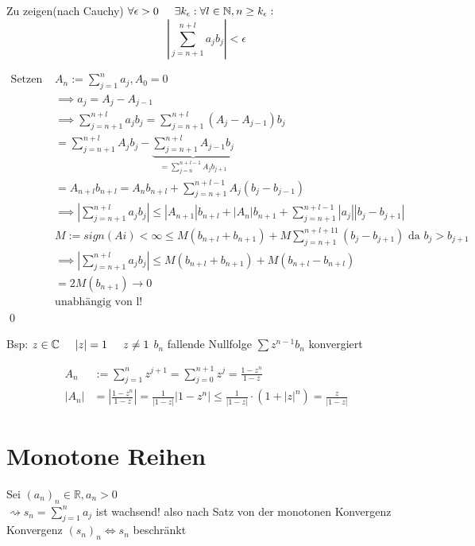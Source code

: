 \documentclass[fleqn]{scrbook}
\newcommand{\R}{\mathbb{R}}
\newcommand{\N}{\mathbb{N}}
\renewenvironment{proof}{{\bfseries Beweis }}{\qed}
\begin{document}
\begin{proof}
 Zu zeigen(nach Cauchy) $\forall \epsilon > 0 \hspace{5mm} \exists k_\epsilon: \forall l \in \N, n \ge k_\epsilon:$
 $$| \sum_{j=n+1}^{n+l} a_j b_j | < \epsilon$$
 
 \begin{equation}
  \begin{split}
    \text{Setzen } & A_n := \sum_{j=1}^{n}a_j, A_0 = 0 \\
    & \implies a_j = A_j - A_{j-1} \\
    & \implies \sum_{j=n+1}^{n+l}  a_j b_j = \sum_{j=n+1}^{n+l} (A_j - A_{j-1}) b_j \\
    & = \sum_{j=n+1}^{n+l}  A_j b_j - \underbrace{\sum_{j=n+1}^{n+l}  A_{j-1} b_j}_{= \sum_{j=n}^{n+l-1} A_j b_{j+1}} \\
    & = A_{n+l} b_{n+l} = A_n b_{n+l} + \sum_{j=n+1}^{n+l-1} A_j (b_j - b_{j-1}) \\
    & \implies | \sum_{j=n+1}^{n+l}  a_j b_j | \le | A_{n+1} | b_{n+l} + |A_n| b_{n+1} + \sum_{j=n+1}^{n+l-1} |a_j| |b_j - b_{j+1}|  \\
    & M := sign(Ai) < \infty \le M (b_{n+l} + b_{n+1}) + M \sum_{j=n+1}^{n+l+11} (b_j - b_{j+1})  \text{  da  } b_j > b_{j+1} \\
    & \implies |\sum_{j=n+1}^{n+l} a_j b_j| \le M(b_{n+l} + b_{n+1}) + M (b_{n+l} - b_{n+l}) \\
    & = 2 M(b_{n+1}) \to 0 \\
    & \text{unabhängig von l!}
  \end{split}
 \end{equation}
\end{proof}

Bsp: $z \in \mathbb{C} \hspace{5mm}  |z| = 1 \hspace{5mm} z \neq 1$
$b_n $ fallende Nullfolge
$\sum z^{n-1} b_n$ konvergiert

\begin{equation}
 \begin{split}
  A_n & := \sum_{j=1}^{n} z^{j+1} = \sum_{j=0}^{n+1}z^j = \frac{1-z^n}{1-z} \\
  |A_n| & = |\frac{1-z^n}{1-z}| = \frac{1}{|1-z|} | 1-z^n| \leq \frac{1}{|1-z|}
  \cdot (1+|z|^n) = \frac{z}{|1-z|}
 \end{split}
\end{equation}

\section{Monotone Reihen}
Sei $(a_n)_n \in \R, a_n > 0$ \\
$\rightsquigarrow s_n = \sum_{j=1}^n a_j$ ist wachsend!
also nach Satz von der monotonen Konvergenz
Konvergenz $(s_n)_n \Leftrightarrow s_n$ beschränkt
\end{document}
